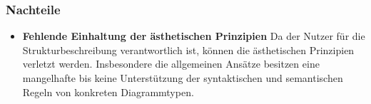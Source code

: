 \subsubsection{Nachteile}

\begin{itemize}

\item
\textbf{Fehlende Einhaltung der ästhetischen Prinzipien}
Da der Nutzer für die Strukturbeschreibung verantwortlich ist, können die ästhetischen Prinzipien verletzt werden. Insbesondere die allgemeinen Ansätze besitzen eine mangelhafte bis keine Unterstützung der syntaktischen und semantischen Regeln von konkreten Diagrammtypen.

\end{itemize}
